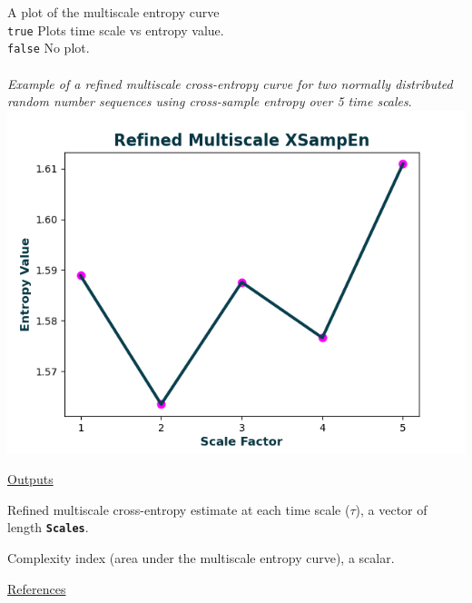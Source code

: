 \documentclass[12pt, a4paper, titlepage, openany]{book}
\begin{document}
\begin{description}[labelsep=1cm, labelwidth=2cm, nosep, style=multiline,leftmargin=3cm]
\begin{description}[labelsep=5em, labelwidth=4em, nosep,style=multiline,leftmargin=2cm]
	\end{description}
\item[\texttt{Plotx}]		A plot of the multiscale entropy curve\\
							\texttt{true} \hspace{15pt} Plots time scale vs entropy value.\\
							\texttt{false}\hspace{12pt} No plot.\\ \ \\
\textit{Example of a refined multiscale cross-entropy curve for two normally distributed random number sequences using cross-sample entropy over 5 time scales}.\\
							\includegraphics[scale=.7]{rXMSEn1.png}\end{description}

\noindent \ul{Outputs}
\begin{description}[labelsep=1cm, labelwidth=2cm, nosep, style=multiline,leftmargin=3cm]\footnotesize
\item[\texttt{MSx}]		Refined multiscale cross-entropy estimate at each time scale ($\tau$), a vector of length 											\textbf{\texttt{Scales}}.
\item[\texttt{Ci}]		Complexity index (area under the multiscale entropy curve), a scalar.
\end{description}

\noindent \ul{References}\hspace{1cm}
\cite{MS1} \cite{XMS1} \cite{rMS1}  



\newpage
\end{document}
